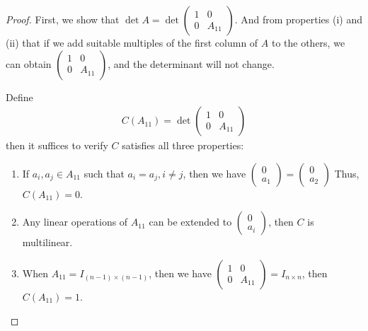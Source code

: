 \documentclass[11pt]{book}
\theoremstyle{definition}
\numberwithin{equation}{chapter}
\begin{document}
\begin{proof}
First, we show that $\det A =\det \left(
    \begin{matrix}
        1 & 0\\
        0 & A_{11}
    \end{matrix}
    \right)$. And from properties (i) and (ii) that if we add suitable multiples of the first column of $A$ to the others, we can obtain $\left(
    \begin{matrix}
        1 & 0\\
        0 & A_{11}
    \end{matrix}
    \right)$, and the determinant will not change.

Define 
\begin{align*}
    C(A_{11}) = \det \left(
    \begin{matrix}
        1 & 0\\
        0 & A_{11}
    \end{matrix}
    \right)
\end{align*}
then it suffices to verify $C$ satisfies all three properties:
\begin{enumerate}[label=(\alph*)]
    \item If $a_i, a_j\in A_{11}$ such that $a_i = a_j, i\neq j$, then we have $\left(
    \begin{matrix}
        0\\
        a_1
    \end{matrix}
    \right) = \left(
    \begin{matrix}
        0\\
        a_2
    \end{matrix}
    \right)$ Thus, $C(A_{11}) = 0$.
    \item Any linear operations of $A_{11}$ can be extended to $\left(
    \begin{matrix}
        0\\
        a_i
    \end{matrix}
    \right)$, then $C$ is multilinear.
    \item When $A_{11} = I_{(n-1)\times(n-1)}$, then we have $\left(
    \begin{matrix}
        1 & 0\\
        0 & A_{11}
    \end{matrix}
    \right) = I_{n\times n}$, then $C(A_{11}) = 1$.
\end{enumerate}
\end{proof}
\end{document}
